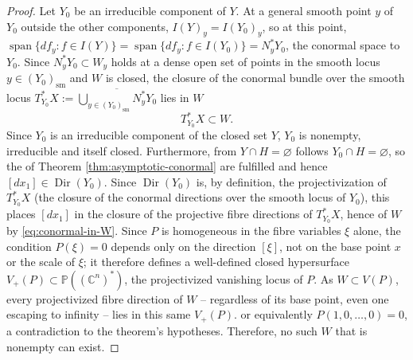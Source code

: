 \documentclass[11pt]{amsart}
\numberwithin{equation}{section}
\theoremstyle{plain}
\theoremstyle{remark}
\begin{document}
\begin{proof}
Let $Y_0$ be an irreducible component of $Y$. At a general smooth point $y$ of
$Y_0$ outside the other components, $I(Y)_y=I(Y_0)_y$, so at this point, $\operatorname{span}\{df_y: f \in I(Y)\} = \operatorname{span}\{df_y: f \in I(Y_0)\} = N_y^*Y_0$, the conormal space to $Y_0$. Since $N_y^*Y_0\subset W_y$ holds at a dense open set of points in the smooth locus $y\in (Y_0)_{\mathrm{sm}}$ and $W$ is closed, the closure of the conormal bundle over the smooth locus $T^*_{Y_0}X := \overline{\bigcup_{y\in(Y_0)_{\mathrm{sm}}}N^*_yY_0}$ lies in $W$
\begin{equation} T^*_{Y_0}X\subset W.
 \label{eq:conormal-in-W}\end{equation}
Since $Y_0$ is an irreducible component of the closed set $Y$, $Y_0$ is nonempty, irreducible and itself closed. Furthermore, from $Y\cap H = \varnothing$ follows $Y_0\cap H = \varnothing$, so the  of
Theorem \ref{thm:asymptotic-conormal} are fulfilled and hence $[dx_1] \in \operatorname{Dir}(Y_0).$ Since $\operatorname{Dir}(Y_0)$ is, by definition, the projectivization of $T^*_{Y_0}X$ (the closure of the
conormal directions over the smooth locus of $Y_0$), this places $[dx_1]$
in the closure of the projective fibre directions of $T^*_{Y_0}X$, hence
of $W$ by \eqref{eq:conormal-in-W}.
Since $P$ is homogeneous in the fibre variables $\xi$ alone, the
condition $P(\xi)=0$ depends only on the direction $[\xi]$, not on the
base point $x$ or the scale of $\xi$; it therefore defines a well-defined
closed hypersurface $V_+(P)\subset\mathbb P((\mathbb C^n)^*)$, the
projectivized vanishing locus of $P$. As $W\subset V(P)$, every
projectivized fibre direction of $W$ -- regardless of its base point, even
one escaping to infinity -- lies in this same $V_+(P)$.  or equivalently $P(1,0,\ldots,0)=0$, a contradiction to the theorem's hypotheses. Therefore, no such $W$ that is nonempty can exist.
\end{proof}
\end{document}
